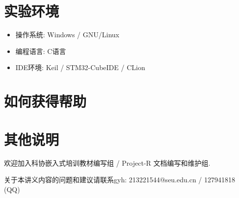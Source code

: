 \section{实验环境}

\begin{itemize}
	\item 操作系统: Windows / GNU/Linux
	\item 编程语言: C语言
	\item IDE环境: Keil / STM32-CubeIDE / CLion
\end{itemize}

\section{如何获得帮助}

\section{其他说明}

欢迎加入科协嵌入式培训教材编写组 / Project-R 文档编写和维护组.

关于本讲义内容的问题和建议请联系gyh: 213221544@seu.edu.cn / 127941818 (QQ)